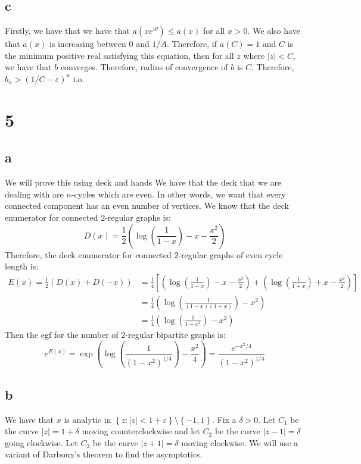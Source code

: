 \documentclass[]{article}
\begin{document}
\subsection{c}
Firstly, we have that we have that $a(x e^{i\theta}) \leq a(x)$ for all $x > 0$. We also have that $a(x)$ is increasing between $0$ and $1/A$. Therefore, if $a(C) = 1$ and $C$ is the minimum positive real satisfying this equation, then for all $z$ where $|z| < C$, we have that $b$ converges. Therefore, radius of convergence of $b$ is $C$. Therefore, $b_n > \left(1/C - \varepsilon \right)^n$ i.o. 

\section{5}

\subsection{a}
We will prove this using deck and hands
We have that the deck that we are dealing with are $n$-cycles which are even. In other words, we want that every connected component has an even number of vertices. We know that the deck enumerator for connected $2$-regular graphs is:
\begin{equation}
	D(x) = \frac{1}{2}\left(\log\left(\frac{1}{1 - x}\right) - x - \frac{x^2}{2}\right)
\end{equation}
Therefore, the deck enumerator for connected $2$-regular graphs of even cycle length is:
\begin{align}
	E(x) = \frac{1}{2} \left(D(x) + D(-x)\right) &= \frac{1}{4} \left[ \left(\log\left(\frac{1}{1 - x}\right) - x - \frac{x^2}{2}\right) + \left(\log\left(\frac{1}{1 + x}\right) + x - \frac{x^2}{2}\right) \right]\\
	&=\frac{1}{4} \left(\log\left(\frac{1}{(1 - x)(1 + x)}\right) - x^2\right) \\
	&=\frac{1}{4} \left(\log\left(\frac{1}{1 - x^2}\right)- x^2\right) 
\end{align}
Then the egf for the number of $2$-regular bipartite graphs is:
\begin{equation}
	e^{E(x)} = \exp\left(\log\left(\frac{1}{(1 - x^2)^{1/4}}\right)- \frac{x^2}{4}\right)  = \frac{e^{-x^2/4}}{(1 - x^2)^{1/4}}
\end{equation}

\subsection{b}
We have that $x$ is analytic in $\left\{ z: |z| < 1 + \varepsilon \right\} \setminus \left\{ -1, 1 \right\}$. Fix a $\delta > 0$. Let $C_1$ be the curve $|z| = 1 + \delta$ moving counterclockwise  and let $C_2$ be the curve $|z - 1| = \delta$ going clockwise. Let $C_3$ be the curve $|z + 1| = \delta$ moving clockwise. We will use a variant of Darboux's theorem to find the asymptotics.
\end{document}
